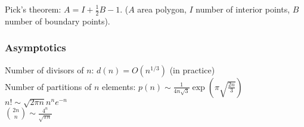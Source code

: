 \documentclass[landscape,a4paper,twocolumn,10pt]{report}
\begin{document}
\noindent Pick's theorem: $A=I+\frac{1}{2}B-1$. ($A$ area polygon, $I$ number of interior points, $B$ number of boundary points).


\subsubsection*{Asymptotics}

\noindent
Number of divisors of $n$: $d(n) = O(n^{1/3})$ (in practice) \\ %
Number of partitions of $n$ elements: $p(n) \sim \frac{1}{4 n \sqrt{3}} \exp(\pi \sqrt{\frac{2n}{3}})$ \\ %
$n! \sim \sqrt{2 \pi n} n^n e^{-n}$ \\ %
$\binom{2n}{n} \sim \frac{4^n}{\sqrt{\pi n}}$


\end{document}
